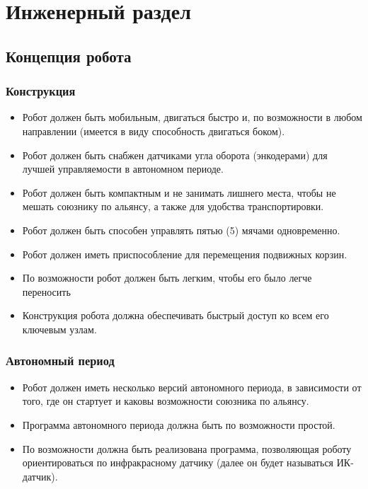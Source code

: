 
\section{Инженерный раздел}
\subsection{Концепция робота}
\subsubsection{Конструкция}
\begin{itemize}
	\item Робот должен быть мобильным, двигаться быстро и, по возможности в любом направлении (имеется в виду способность двигаться боком).
	\item Робот должен быть снабжен датчиками угла оборота (энкодерами) для лучшей управляемости в автономном периоде.
	\item Робот должен быть компактным и не занимать лишнего места, чтобы не мешать союзнику по альянсу, а также для удобства транспортировки.
	\item Робот должен быть способен управлять пятью (5) мячами одновременно.
	\item Робот должен иметь приспособление для перемещения подвижных корзин.
	\item По возможности робот должен быть легким, чтобы его было легче переносить
	\item Конструкция робота должна обеспечивать быстрый доступ ко всем его ключевым узлам.
\end{itemize}
\subsubsection{Автономный период}
\begin{itemize}
	\item Робот должен иметь несколько версий автономного периода, в зависимости от того, где он стартует и каковы возможности союзника по альянсу.
	\item Программа автономного периода должна быть по возможности простой.
	\item По возможности должна быть реализована программа, позволяющая роботу ориентироваться по инфракрасному датчику (далее он будет называться ИК-датчик).
\end{itemize}
